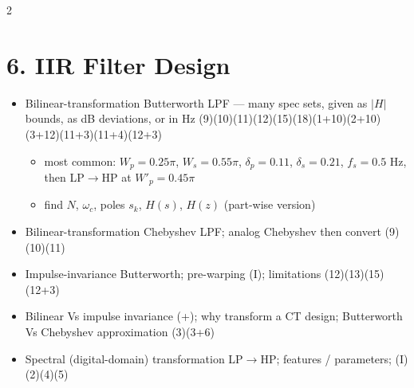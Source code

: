 \documentclass[10pt]{article}
\begin{document}
\begin{multicols}{2}
\section*{6. IIR Filter Design}
\begin{itemize}
  \item Bilinear-transformation Butterworth LPF --- many spec sets, given as $|H|$ bounds, as dB deviations, or in Hz \hfill (9)\allowbreak(10)\allowbreak(11)\allowbreak(12)\allowbreak(15)\allowbreak(18)\allowbreak(1+10)\allowbreak(2+10)\allowbreak(3+12)\allowbreak(11+3)\allowbreak(11+4)\allowbreak(12+3)
    \begin{itemize}
      \item most common: $W_p=0.25\pi$, $W_s=0.55\pi$, $\delta_p=0.11$, $\delta_s=0.21$, $f_s=0.5$ Hz, then LP$\to$HP at $W'_p=0.45\pi$
      \item find $N$, $\omega_c$, poles $s_k$, $H(s)$, $H(z)$ (part-wise version)
    \end{itemize}
  \item Bilinear-transformation Chebyshev LPF; analog Chebyshev then convert \hfill (9)\allowbreak(10)\allowbreak(11)
  \item Impulse-invariance Butterworth; pre-warping (I); limitations \hfill (12)\allowbreak(13)\allowbreak(15)\allowbreak(12+3)
  \item Bilinear Vs impulse invariance (+); why transform a CT design; Butterworth Vs Chebyshev approximation \hfill (3)\allowbreak(3+6)
  \item Spectral (digital-domain) transformation LP$\to$HP; features / parameters; (I) \hfill (2)\allowbreak(4)\allowbreak(5)
\end{itemize}


\end{multicols}
\end{document}
